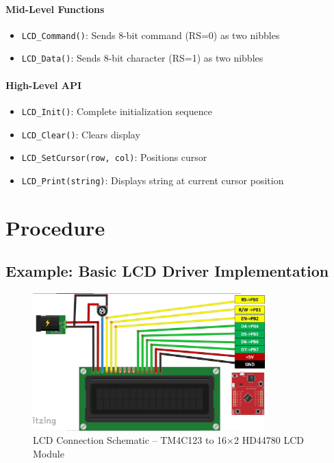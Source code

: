 \paragraph{Mid-Level Functions}
\begin{itemize}[nosep]
  \item \texttt{LCD\_Command()}: Sends 8-bit command (RS=0) as two nibbles
  \item \texttt{LCD\_Data()}: Sends 8-bit character (RS=1) as two nibbles
\end{itemize}

\paragraph{High-Level API}
\begin{itemize}[nosep]
  \item \texttt{LCD\_Init()}: Complete initialization sequence
  \item \texttt{LCD\_Clear()}: Clears display
  \item \texttt{LCD\_SetCursor(row, col)}: Positions cursor
  \item \texttt{LCD\_Print(string)}: Displays string at current cursor position
\end{itemize}

\newpage
\section{Procedure}

\subsection{Example: Basic LCD Driver Implementation}
\begin{figure}[H]
  \centering
  \includegraphics[width=0.8\textwidth]{resources/lcd_connection.png}
  \caption{LCD Connection Schematic – TM4C123 to 16×2 HD44780 LCD Module\protect\footnotemark}
\end{figure}


